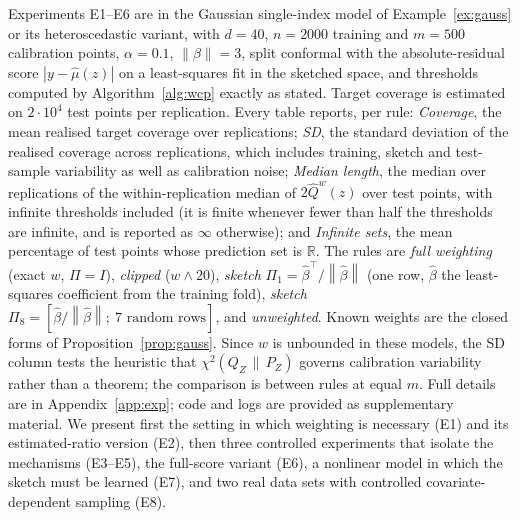 \documentclass[11pt,a4paper]{article}
\newcommand{\chisqZ}{\chi^2(Q_Z\,\|\,P_Z)}
\newcommand{\norm}[1]{\left\|#1\right\|}
\newcommand{\R}{\mathbb{R}}
\theoremstyle{plain}
\theoremstyle{definition}
\theoremstyle{remark}
\begin{document}
Experiments E1--E6 are in the Gaussian single-index model of Example~\ref{ex:gauss} or its heteroscedastic variant, with $d=40$, $n=2000$ training and $m=500$ calibration points, $\alpha=0.1$, $\norm\beta=3$, split conformal with the absolute-residual score $|y-\hat\mu(z)|$ on a least-squares fit in the sketched space, and thresholds computed by Algorithm~\ref{alg:wcp} exactly as stated. Target coverage is estimated on $2\cdot10^4$ test points per replication. Every table reports, per rule: \emph{Coverage}, the mean realised target coverage over replications; \emph{SD}, the standard deviation of the realised coverage across replications, which includes training, sketch and test-sample variability as well as calibration noise; \emph{Median length}, the median over replications of the within-replication median of $2\widehat Q^w(z)$ over test points, with infinite thresholds included (it is finite whenever fewer than half the thresholds are infinite, and is reported as $\infty$ otherwise); and \emph{Infinite sets}, the mean percentage of test points whose prediction set is $\R$. The rules are \emph{full weighting} (exact $w$, $\Pi=I$), \emph{clipped} ($w\wedge20$), \emph{sketch} $\Pi_1=\hat\beta^{\!\top}/\norm{\hat\beta}$ (one row, $\hat\beta$ the least-squares coefficient from the training fold), \emph{sketch} $\Pi_8=[\hat\beta/\norm{\hat\beta};\ 7\text{ random rows}]$, and \emph{unweighted}. Known weights are the closed forms of Proposition~\ref{prop:gauss}. Since $w$ is unbounded in these models, the SD column tests the heuristic that $\chisqZ$ governs calibration variability rather than a theorem; the comparison is between rules at equal $m$. Full details are in Appendix~\ref{app:exp}; code and logs are provided as supplementary material. We present first the setting in which weighting is necessary (E1) and its estimated-ratio version (E2), then three controlled experiments that isolate the mechanisms (E3--E5), the full-score variant (E6), a nonlinear model in which the sketch must be learned (E7), and two real data sets with controlled covariate-dependent sampling (E8).
\end{document}
